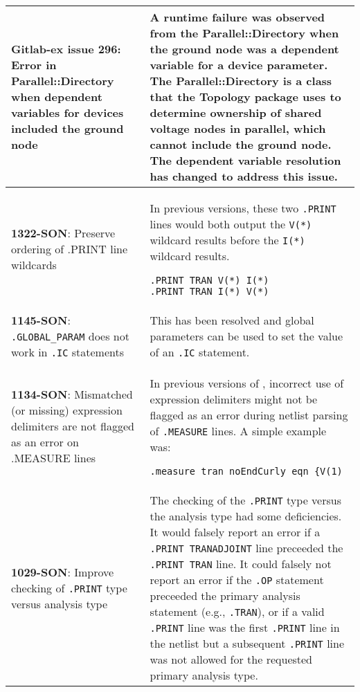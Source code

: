 {\begin{longtable}[h] {>{\raggedright\small}m{2in}|>{\raggedright\let\\\tabularnewline\small}m{3.5in}}
  \textbf{Gitlab-ex issue 296}: Error in Parallel::Directory when dependent 
variables for devices included the ground node &  A runtime failure was observed
from the Parallel::Directory when the ground node was a dependent variable
for a device parameter.  The Parallel::Directory is a class that the Topology package 
uses to determine ownership of shared voltage nodes in parallel, which cannot 
include the ground node.  The dependent variable
resolution has changed to address this issue. \\ \hline

  \textbf{1322-SON}: Preserve ordering of .PRINT line wildcards &
In previous \Xyce{} versions, these two \texttt{.PRINT} lines would
both output the \texttt{V(*)} wildcard results before the \texttt{I(*)}
wildcard results.
\begin{verbatim}
.PRINT TRAN V(*) I(*)
.PRINT TRAN I(*) V(*)
\end{verbatim}
\\ \hline

  \textbf{1145-SON}: \texttt{.GLOBAL\_PARAM} does not work
in \texttt{.IC} statements & This has been resolved and global
parameters can be used to set the value of an \texttt{.IC}
statement.\\ \hline

  \textbf{1134-SON}: Mismatched (or missing) expression delimiters
are not flagged as an error on .MEASURE lines & In previous versions
of \Xyce{}, incorrect use of expression delimiters might not be
flagged as an error during netlist parsing of \texttt{.MEASURE}
lines.  A simple example was:
\begin{verbatim}
.measure tran noEndCurly eqn {V(1)
\end{verbatim}
\\ \hline

  \textbf{1029-SON}: Improve checking of \texttt{.PRINT} type versus
analysis type & The checking of the \texttt{.PRINT} type versus the
analysis type had some deficiencies. It would falsely report an error
if a \texttt{.PRINT TRANADJOINT} line preceeded the \texttt{.PRINT
TRAN} line.  It could falsely not report an error if the \texttt{.OP}
statement preceeded the primary analysis statement (e.g.,
\texttt{.TRAN}), or if a valid \texttt{.PRINT} line was the first \texttt{.PRINT}
line in the netlist but a subsequent \texttt{.PRINT} line was not allowed
for the requested primary analysis type. \\ \hline

\end{longtable}
}

